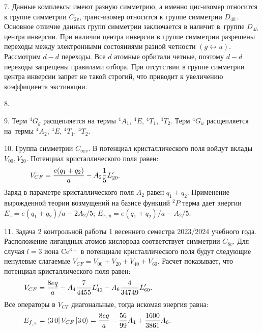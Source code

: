 7. Данные комплексы имеют разную симметрию, а именно цис-изомер относится к группе симметрии $C_{2v}$, транс-изомер относится к группе симметрии $D_{4h}$. Основное отличие данных групп симметрии заключается в наличит в~группе $D_{4h}$ центра инверсии. При наличии центра инверсии в группе симметрии разрешены переходы между электронными состояниями разной четности $(g \leftrightarrow u)$. Рассмотрим $d-d$ переходы. Все $d$ атомные орбитали четные, поэтому $d-d$ переходы запрещены правилами отбора. При отсутствии в группе симметрии центра инверсии запрет не такой строгий, что приводит к увеличению коэффициента экстинкции.\par
8. \par
9. Терм $^4G_g$ расщепляется на термы $^4A_1$, $^4E$, $^4T_1$, $^4T_2$. Терм $^4G_u$ расщепляется на~термы $^4A_2$, $^4E$, $^4T_1$, $^4T_2$.\par\par
10. Группа симметрии $C_{\infty v}$. В потенциал кристаллического поля войдут вклады $V_{00}, V_{20}$. Потенциал кристаллического поля равен:
\begin{equation*}
\begin{aligned}
& V_{CF}= \dfrac{e(q_1+q_2)}{a} - A_2 \dfrac{1}{5}L_{20}' . \hspace{53mm}
\end{aligned}
\end{equation*}
Заряд в параметре кристаллического поля $A_2$ равен $q_1+q_2$. Применение вырожденной теории возмущений на базисе функций $^2P$ терма дает энергии $E_{z} = e(q_1+q_2)/a - 2A_2/5$; $E_{x,\, y} =e(q_1+q_2)/a - A_2/5$.\par
11. Задача 2 контрольной работы 1 весеннего семестра 2023/2024 учебного года. Расположение лигандных атомов кислорода соответствует симметрии $C_{8v}$. Для случая $l=3$ иона Ce$^{3+}$ в потенциале кристаллического поля будут следующие ненулевые слагаемые $V_{CF}=V_{00}+V_{20}+V_{40}+V_{60}$. Расчет показывает, что потенциал кристаллического поля равен:
\begin{equation*}
\begin{aligned}
& V_{CF}= \dfrac{8eq}{a} - A_4 \dfrac{7}{4455}L_{40}' - A_6 \dfrac{4}{34749}L_{60}'. \hspace{40mm}
\end{aligned}
\end{equation*}
Все операторы в $V_{CF}$ диагональные, тогда искомая энергия равна: 
\begin{equation*}
\begin{aligned}
& E_{f_{z^3}}=\bra{3\,0} V_{CF} \ket{3\,0} =\dfrac{8eq}{a} -  \dfrac{56}{99}A_4 + \dfrac{1600}{3861}A_6. \hspace{31mm}
\end{aligned}
\end{equation*}\par 
